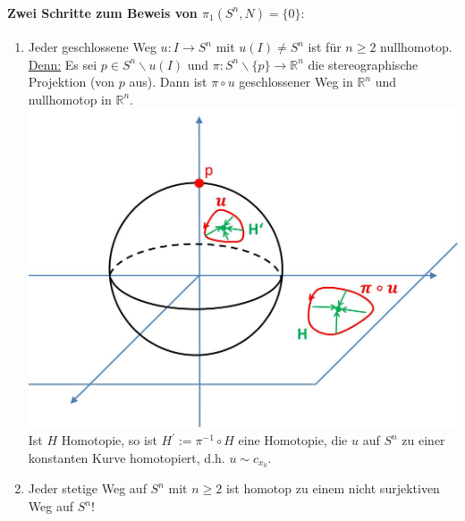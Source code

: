 \documentclass[a4paper,11pt,notitlepage]{report}
\theoremstyle{remark}
\theoremstyle{definition}
\newcommand{\R}{{\ensuremath{\mathbb{R}}}}
\begin{document}
\paragraph{Zwei Schritte zum Beweis von $\pi_1(S^n,N) = \{0\}:$}
\begin{enumerate}
	\item Jeder geschlossene Weg $u \colon I \rightarrow S^n$ mit $u(I) \neq S^n$ ist für $n \geq 2$ nullhomotop.
	\newline
	\underline{Denn:} Es sei $p \in S^n \backslash u(I)$ und $\pi \colon S^n \backslash \{p\} \rightarrow \R^n$ die stereographische Projektion (von $p$ aus). Dann ist $\pi \circ u$ geschlossener Weg in $\R^n$ und nullhomotop in $\R^n$. \newline \includegraphics[scale=0.4]{images/Weg_S2_nullhomotop.jpg}
	\newline
	Ist $H$ Homotopie, so ist $H^\prime := \pi^{-1} \circ H$ eine Homotopie, die $u$ auf $S^n$ zu einer konstanten Kurve homotopiert, d.h. $u \sim c_{x_0}$.
	
	\item Jeder stetige Weg auf $S^n$ mit $n\geq 2$ ist homotop zu einem nicht surjektiven Weg auf $S^n$!
\end{enumerate}
\end{document}
